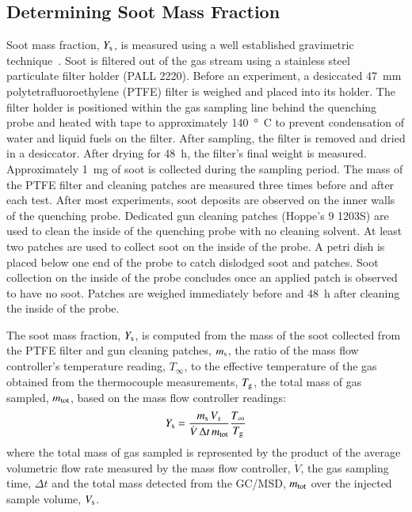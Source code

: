 \documentclass[preprint,review,12pt]{elsarticle}
\begin{document}
\subsection{Determining Soot Mass Fraction}
\label{ssec:Soot_Setup}
Soot mass fraction, $Y_{\rm s}$, is measured using a well established gravimetric technique~\cite{Choi1995}. Soot is filtered out of the gas stream using a stainless steel particulate filter holder (PALL 2220). Before an experiment, a desiccated \SI{47}{mm} polytetrafluoroethylene (PTFE) filter is weighed and placed into its holder. The filter holder is positioned within the gas sampling line behind the quenching probe and heated with tape to approximately \SI{140}{\degree C} to prevent condensation of water and liquid fuels on the filter. After sampling, the filter is removed and dried in a desiccator. After drying for 48~h, the filter’s final weight is measured. Approximately \SI{1}{mg} of soot is collected during the sampling period. The mass of the PTFE filter and cleaning patches are measured three times before and after each test. After most experiments, soot deposits are observed on the inner walls of the quenching probe. Dedicated gun cleaning patches (Hoppe's 9 1203S) are used to clean the inside of the quenching probe with no cleaning solvent. At least two patches are used to collect soot on the inside of the probe. A petri dish is placed below one end of the probe to catch dislodged soot and patches. Soot collection on the inside of the probe concludes once an applied patch is observed to have no soot. Patches are weighed immediately before and 48~h after cleaning the inside of the probe.

The soot mass fraction, $Y_{\rm s}$, is computed from the mass of the soot collected from the PTFE filter and gun cleaning patches, $m_{\rm s}$, the ratio of the mass flow controller's temperature reading, $T_{\infty}$, to the effective temperature of the gas obtained from the thermocouple measurements, $T_{\rm g}$, the total mass of gas sampled, $m_{\rm tot}$, based on the mass flow controller readings:
\begin{equation}\label{eq:overall_soot_mass_frac}
Y_{\rm s}= \frac{m_{\rm s} \, V_{s}}{\dot{V} \, \Delta t \, m_{\rm tot}}\frac{T_{\rm \infty}}{T_{\rm g}}
\end{equation}
where the total mass of gas sampled is represented by the product of the average volumetric flow rate measured by the mass flow controller, $\dot{V}$, the gas sampling time, $\Delta t$ and the total mass detected from the GC/MSD, $m_{\rm tot}$ over the injected sample volume, $V_{\rm s}$.
\end{document}
